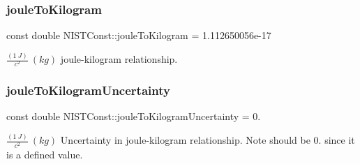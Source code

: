 \subsubsection{\texorpdfstring{joule\+To\+Kilogram}{jouleToKilogram}}
{\footnotesize\ttfamily const double N\+I\+S\+T\+Const\+::joule\+To\+Kilogram = 1.\+112650056e-\/17}

$\frac{(1\ J)}{c^2} \ (kg)$ joule-\/kilogram relationship. \mbox{\label{group___n_i_s_t_const-_joule_gaf14b109cdaf9892023dc33ceecdc0b9f}} 
\subsubsection{\texorpdfstring{joule\+To\+Kilogram\+Uncertainty}{jouleToKilogramUncertainty}}
{\footnotesize\ttfamily const double N\+I\+S\+T\+Const\+::joule\+To\+Kilogram\+Uncertainty = 0.}

$\frac{(1\ J)}{c^2} \ (kg)$ Uncertainty in joule-\/kilogram relationship. Note should be 0. since it is a defined value. 